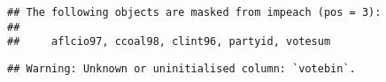 \documentclass[
]{article}
\newenvironment{Shaded}{\begin{snugshade}}{\end{snugshade}}
\newcommand{\CommentTok}[1]{\textcolor[rgb]{0.56,0.35,0.01}{\textit{#1}}}
\newcommand{\DecValTok}[1]{\textcolor[rgb]{0.00,0.00,0.81}{#1}}
\newcommand{\NormalTok}[1]{#1}
\newcommand{\OtherTok}[1]{\textcolor[rgb]{0.56,0.35,0.01}{#1}}
\newcommand{\SpecialCharTok}[1]{\textcolor[rgb]{0.00,0.00,0.00}{#1}}
\begin{document}
\begin{verbatim}
## The following objects are masked from impeach (pos = 3):
## 
##     aflcio97, ccoal98, clint96, partyid, votesum
\end{verbatim}

\begin{Shaded}
\end{Shaded}

\begin{verbatim}
## Warning: Unknown or uninitialised column: `votebin`.
\end{verbatim}
\end{document}
